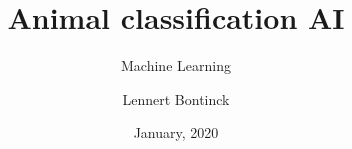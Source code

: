 \title{Animal classification AI}
\subtitle{Machine Learning}
\author{Lennert Bontinck}
\date{January, 2020}
